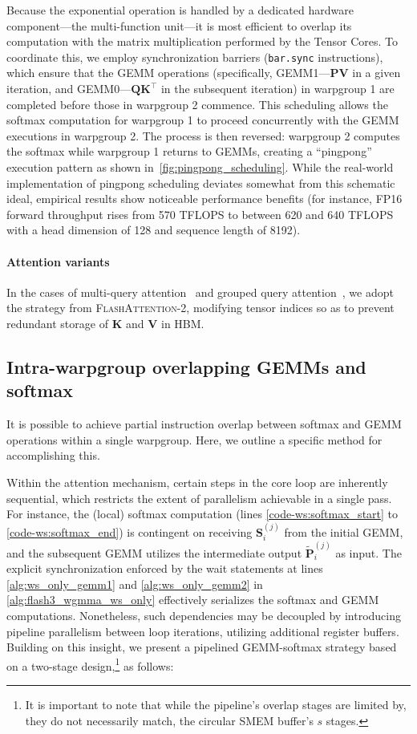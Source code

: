 Because the exponential operation is handled by a dedicated hardware component—the multi-function unit—it is most efficient to overlap its computation with the matrix multiplication performed by the Tensor Cores. To coordinate this, we employ synchronization barriers (\texttt{bar.sync} instructions), which ensure that the GEMM operations (specifically, GEMM1—$\mathbf{P} \mathbf{V}$ in a given iteration, and GEMM0—$\mathbf{Q} \mathbf{K}^\top$ in the subsequent iteration) in warpgroup 1 are completed before those in warpgroup 2 commence. This scheduling allows the softmax computation for warpgroup 1 to proceed concurrently with the GEMM executions in warpgroup 2. The process is then reversed: warpgroup 2 computes the softmax while warpgroup 1 returns to GEMMs, creating a “pingpong” execution pattern as shown in~\cref{fig:pingpong_scheduling}. While the real-world implementation of pingpong scheduling deviates somewhat from this schematic ideal, empirical results show noticeable performance benefits (for instance, FP16 forward throughput rises from 570 TFLOPS to between 620 and 640 TFLOPS with a head dimension of 128 and sequence length of 8192).

\paragraph{Attention variants} In the cases of multi-query attention~\citep{shazeer2019fast} and grouped query attention~\citep{ainslie2023gqa}, we adopt the strategy from \textsc{FlashAttention-2}, modifying tensor indices so as to prevent redundant storage of $\mathbf{K}$ and $\mathbf{V}$ in HBM.

\subsection{Intra-warpgroup overlapping GEMMs and softmax}

It is possible to achieve partial instruction overlap between softmax and GEMM operations within a single warpgroup. Here, we outline a specific method for accomplishing this.

Within the attention mechanism, certain steps in the core loop are inherently sequential, which restricts the extent of parallelism achievable in a single pass. For instance, the (local) softmax computation (lines \ref{code-ws:softmax_start} to \ref{code-ws:softmax_end}) is contingent on receiving $\mathbf{S}_i^{(j)}$ from the initial GEMM, and the subsequent GEMM utilizes the intermediate output $\widetilde{\mathbf{P}}_i^{(j)}$ as input. The explicit synchronization enforced by the wait statements at lines \ref{alg:ws_only_gemm1} and \ref{alg:ws_only_gemm2} in \cref{alg:flash3_wgmma_ws_only} effectively serializes the softmax and GEMM computations. Nonetheless, such dependencies may be decoupled by introducing pipeline parallelism between loop iterations, utilizing additional register buffers. Building on this insight, we present a pipelined GEMM-softmax strategy based on a two-stage design,\footnote{It is important to note that while the pipeline’s overlap stages are limited by, they do not necessarily match, the circular SMEM buffer’s $s$ stages.} as follows:


